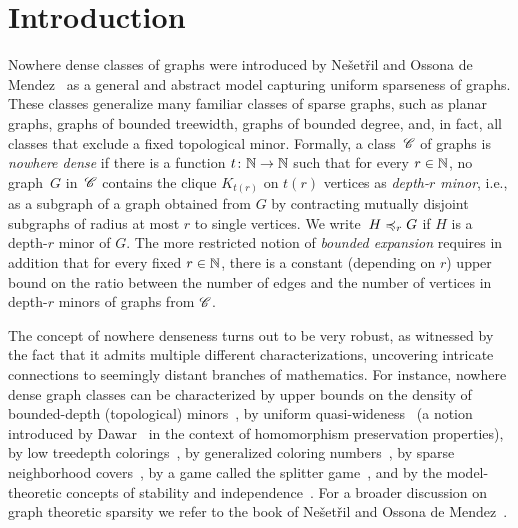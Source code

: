 \section{Introduction}\label{sec:intro}

Nowhere dense classes of graphs were introduced by Ne\v set\v ril and
Ossona de Mendez~\cite{nevsetvril2010first,nevsetvril2011nowhere} as a
general and abstract model capturing uniform sparseness of
graphs. These classes generalize many familiar classes of sparse
graphs, such as planar graphs, graphs of bounded treewidth, graphs of
bounded degree, and, in fact, all classes that exclude a fixed
topological minor.  Formally, a class~$\mathscr{C}$ of graphs is {\em{nowhere
    dense}} if there is a function $t\colon \mathbb{N}\to \mathbb{N}$ such that for
every $r\in \mathbb{N}$, no graph~$G$ in~$\mathscr{C}$ contains the clique $K_{t(r)}$
on $t(r)$ vertices as {\em{depth-$r$ minor}}, i.e., as a subgraph of a
graph obtained from $G$ by contracting mutually disjoint subgraphs of
radius at most $r$ to single vertices.  We write~$H\preccurlyeq_r G$ if $H$
is a depth-$r$ minor of $G$.  The more restricted notion of
{\em{bounded expansion}} requires in addition that for every fixed
$r\in\mathbb{N}$, there is a constant (depending on $r$) upper bound on the
ratio between the number of edges and the number of vertices in
depth-$r$ minors of graphs from $\mathscr{C}$.

The concept of nowhere denseness turns out to be very robust, as
witnessed by the fact that it admits multiple different
characterizations, uncovering intricate connections to seemingly
distant branches of mathematics.  For instance, nowhere dense graph
classes can be characterized by upper bounds on the density of
bounded-depth (topological)
minors~\cite{nevsetvril2010first,nevsetvril2011nowhere}, by uniform
quasi-wideness~\cite{nevsetvril2011nowhere} (a notion introduced by
Dawar~\cite{Dawar07} in the context of homomorphism preservation
properties), by low treedepth colorings~\cite{nevsetvril2008grad}, by
generalized coloring numbers~\cite{zhu2009coloring}, by sparse
neighborhood covers~\cite{GroheKRSS15,grohe2014deciding}, by a game
called the splitter game~\cite{grohe2014deciding}, and by the
model-theoretic concepts of stability and
independence~\cite{adler2014interpreting}.  For a broader discussion
on graph theoretic sparsity we refer to the book of Ne\v{s}et\v{r}il
and Ossona de Mendez~\cite{sparsity}.

